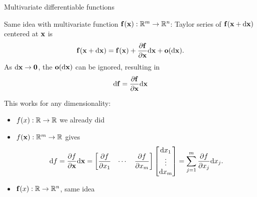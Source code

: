 \documentclass[8pt, aspectratio=149]{beamer}
\begin{document}
\begin{frame}{Multivariate differentiable functions}

    Same idea with multivariate function \( \mVector{f}(\mVector{x}): \R^m \to \R^n \): Taylor series of \( \mVector{f}(\mVector{x} + \diff \mVector{x}) \) 
    centered at \( \mVector{x} \) is 
    \begin{align*}
        \mVector{f}(\mVector{x} + \diff \mVector{x}) 
        = \mVector{f}(\mVector{x}) + \frac{\partial \mVector{f}}{\partial \mVector{x}} \diff \mVector{x} + \mVector{o}(\diff \mVector{x}). 
    \end{align*}
    As \( \diff \mVector{x} \to \mVector{0} \), the \( \mVector{o}(\diff \mVector{x}) \) can be ignored, 
    resulting in 
    \begin{align*}
        \diff \mVector{f} 
        = \frac{\partial \mVector{f}}{\partial \mVector{x}} \diff \mVector{x} 
    \end{align*}

    \vspace{1em} 
    This works for any dimensionality: 
    \begin{itemize}
        \item \( f(x): \mathbb{R} \to \mathbb{R} \) we already did 
        \item \( f(\mVector{x}): \R^m \to \R \) gives 
        \begin{align*}
            \diff f 
            = \frac{\partial f}{\partial \mVector{x}} \diff \mVector{x} 
            = \begin{bmatrix}
                \displaystyle \frac{\partial f}{\partial x_1} & \cdots & \displaystyle \frac{\partial f}{\partial x_m} 
            \end{bmatrix} \begin{bmatrix}
                \diff x_1 \\ \vdots \\ \diff x_m
            \end{bmatrix} 
            = \sum_{j = 1}^m \frac{\partial f}{\partial x_j} \diff x_j. 
        \end{align*}
        \item \( \mVector{f}(x): \R \to \R^n \), same idea 
    \end{itemize}

\end{frame}



\begin{frame}{}

    

\end{frame}
\end{document}
